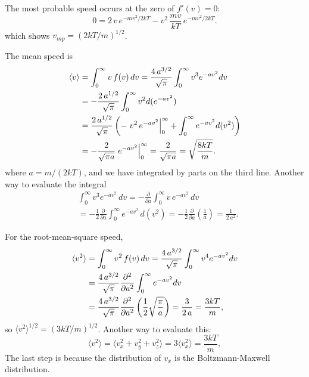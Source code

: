 \documentclass[twocolumn, 10pt]{article}
\numberwithin{equation}{section}
\newenvironment{solution}[1][\empty]
{\par\medskip\sffamily
  \textbf{\ifx\empty#1{Solution.}\relax\else{#1}\fi} \ignorespaces}
{\medskip}
\begin{document}
\begin{solution}
The most probable speed
occurs at the zero of $f'(v) = 0$:
$$
0 =
  2 \, v \, e^{-mv^2/2kT}
  -v^2 \, \frac{mv}{kT} \, e^{-mv^2/2kT}.
$$
which shows $v_{mp} = (2kT/m)^{1/2}$.

The mean speed is
\begin{align}
  \langle v \rangle
  &=
  \int_0^\infty v \, f(v) \, dv
  =
  \frac{4 \, a^{3/2}}{\sqrt\pi}
  \int_0^\infty
    v^3 e^{-av^2} dv
  \notag
  \\
  &=
  -\frac{2 \, a^{1/2}}{\sqrt\pi}
  \int_0^\infty
    v^2 d(e^{-av^2})
  \notag
  \\
  &=
  \frac{2 \, a^{1/2}}{\sqrt\pi}
  \left(
  -\left. v^2 \, e^{-av^2} \right|_0^\infty
  +
  \int_0^\infty
    e^{-av^2} d(v^2)
  \right)
  \notag
  \\
  &=
  -\frac{2}{\sqrt{\pi a}}
  \left.  e^{-av^2}\right|_0^\infty
  =
  \frac{2}{\sqrt{\pi a}}
  =
    \sqrt{ \frac{8kT}{m} }
  .
  \label{eq:absv_ave}
\end{align}
where $a = m/(2kT)$,
and we have integrated by parts
on the third line.
%
Another way to evaluate the integral
%
\begin{align*}
  &\int_0^\infty
    v^3 e^{-av^2} \, dv
  =
  -\frac{\partial}{\partial a}
  \int_0^\infty
    v \, e^{-av^2} \, dv
  \\
  &=
  -\frac{1}{2}
  \frac{\partial}{\partial a}
  \int_0^\infty
    e^{-av^2} \, d(v^2)
  =
  -\frac{1}{2}
  \frac{\partial}{\partial a}
    \left(  \frac{1}{a} \right)
  =\frac{1}{2 \, a^2}.
\end{align*}

For the root-mean-square speed,
\begin{align}
  \langle v^2 \rangle
  &=
  \int_0^\infty v^2 \, f(v) \, dv
  =
  \frac{4 \, a^{3/2}}{\sqrt\pi}
  \int_0^\infty
    v^4 e^{-av^2} dv
  \notag \\
  &=
  \frac{4 \, a^{3/2}}{\sqrt\pi}
    \frac{ \partial^2 } { \partial a^2 }
  \int_0^\infty
    e^{-av^2} d v
  \notag \\
  &=
  \frac{4 \, a^{3/2}}{\sqrt\pi}
    \frac{ \partial^2 } { \partial a^2 }
    \left( \frac{1}{2} \sqrt{ \frac{ \pi } { a } } \right)
  =
  \frac{3}{2 \, a}
  =
  \frac{3kT}{m}
  ,
  \label{eq:v2_ave}
\end{align}
so $\langle v^2 \rangle^{1/2} = (3kT/m)^{1/2}$.
%
Another way to evaluate this:
$$
\langle v^2 \rangle
=
\langle v_x^2 + v_y^2 + v_z^2 \rangle
=
3 \langle v_x^2 \rangle
=
\frac{ 3 k T } { m },
$$
The last step is because
the distribution of $v_x$
is the Boltzmann-Maxwell distribution.


\end{solution}
\end{document}
